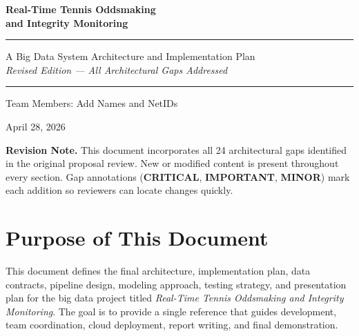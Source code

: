 \documentclass[11pt,a4paper]{article}
\begin{document}
\begin{titlepage}
  \centering
  \vspace*{2cm}
  {\huge\bfseries\color{sectionblue} Real-Time Tennis Oddsmaking\\[6pt] and Integrity Monitoring\par}
  \vspace{1cm}
  \rule{\linewidth}{1pt}
  \vspace{4pt}
  {\large A Big Data System Architecture and Implementation Plan\\
  \textit{Revised Edition --- All Architectural Gaps Addressed}\par}
  \vspace{4pt}
  \rule{\linewidth}{1pt}
  \vspace{1.5cm}
  {\normalsize Team Members: Add Names and NetIDs\par}
  \vspace{0.5cm}
  {\normalsize April 28, 2026\par}
  \vspace{2cm}
  \begin{tcolorbox}[colback=fixlight, colframe=fixblue, width=0.85\linewidth]
    \centering\small
    \textbf{Revision Note.}
    This document incorporates all 24 architectural gaps identified in the
    original proposal review. New or modified content is present throughout
    every section. Gap annotations (\textcolor{criticalred}{\textbf{CRITICAL}},
    \textcolor{importantyellow}{\textbf{IMPORTANT}},
    \textcolor{minorgray}{\textbf{MINOR}}) mark each
    addition so reviewers can locate changes quickly.
  \end{tcolorbox}
\end{titlepage}

\tableofcontents
\newpage

\section{Purpose of This Document}

This document defines the final architecture, implementation plan, data contracts, pipeline design,
modeling approach, testing strategy, and presentation plan for the big data project titled
\textit{Real-Time Tennis Oddsmaking and Integrity Monitoring}. The goal is to provide a single
reference that guides development, team coordination, cloud deployment, report writing, and final
demonstration.
\end{document}
